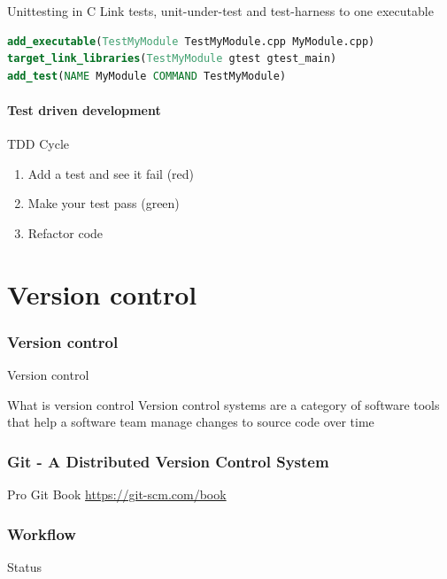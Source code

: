 \documentclass{beamer}
\begin{document}
\begin{frame}[fragile]{Unittesting in C}
Link tests, unit-under-test and test-harness to one executable
\begin{lstlisting}[language=cmake,caption=a unit test in cmake]
add_executable(TestMyModule TestMyModule.cpp MyModule.cpp)
target_link_libraries(TestMyModule gtest gtest_main)
add_test(NAME MyModule COMMAND TestMyModule)
\end{lstlisting}
\end{frame}

\subsection{Test driven development}

\begin{frame}{TDD Cycle}
\begin{enumerate}
  \item Add a test and see it fail (red)
  \item Make your test pass (green)
  \item Refactor code
\end{enumerate}
\end{frame}

\part{Version control}
\section{Version control}

\begin{frame}{Version control}
\begin{block}{What is version control}
Version control systems are a category of software tools that help a software
team manage changes to source code over time
\end{block}
\end{frame}

\section{Git - A Distributed Version Control System}
\begin{frame}{Pro Git Book}
\url{https://git-scm.com/book}
\end{frame}

\section{Workflow}
\begin{frame}{Status}
\end{frame}
\end{document}

